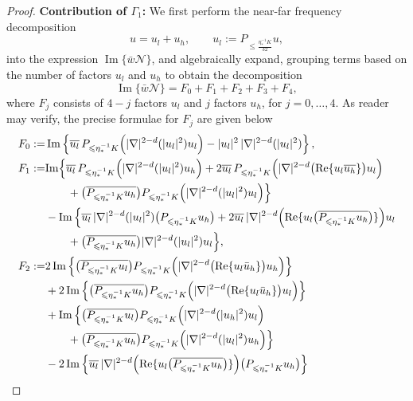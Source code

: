 \documentclass[reqno,11pt]{amsart}
\theoremstyle{plain}
\theoremstyle{definition}
\numberwithin{equation}{section}
\numberwithin{theorem}{section}
\def\leq{\leqslant}
\begin{document}
\begin{proof}
\textbf{Contribution of $\Gamma_1$:}
We first perform the near-far frequency decomposition
\[
u=u_{l}+u_{h}, \qquad u_{l} := P_{\leq\frac{\eta_{\ast}^{-1}K}{32}}u,
\]
into the expression $\operatorname{Im}\{\bar{w}\mathcal{N}\}$, and algebraically expand, grouping terms based on the number of factors $u_{l}$ and $u_{h}$ to obtain the decomposition
\[
\operatorname{Im}\{\bar{w}\mathcal{N}\} = F_0 + F_1 + F_2 + F_3 + F_4, 
\]
where $F_j$ consists of $4 - j$ factors $u_{l}$ and $j$ factors $u_{h}$, for $j = 0, \ldots, 4$. As reader may verify, the precise formulae for $F_j$ are given below
\begin{align*}
F_0 :=& \operatorname{Im}\left\{ \overline{u_l} \, P_{\leq \eta_{\ast}^{-1}K}\Bigl(|\nabla|^{2-d}(|u_l|^2) u_l\Bigr) - |u_l|^2 \, |\nabla|^{2-d}(|u_l|^2) \right\}, \\
F_1 :=& {\rm Im}\Big\{ \overline{u_l} \, P_{\leq \eta_{\ast}^{-1}K}\Bigl(|\nabla|^{2-d}(|u_l|^2) u_h\Bigr) 
+ 2\overline{u_l} \, P_{\leq \eta_{\ast}^{-1}K}\Bigl(|\nabla|^{2-d}\bigl(\operatorname{Re}\{u_l \overline{u_h}\}\bigr) u_l\Bigr)\\ 
&\qquad+ \bigl(\overline{P_{\leq \eta_{\ast}^{-1}K} u_h}\bigr) P_{\leq \eta_{\ast}^{-1}K}\Bigl(|\nabla|^{2-d}(|u_l|^2) u_l\Bigr) \Big\} \\
& - \operatorname{Im}\Big\{ \overline{u_l} \, |\nabla|^{2-d}(|u_l|^2) \bigl(P_{\leq \eta_{\ast}^{-1}K} u_h\bigr) 
+ 2\overline{u_l} \, |\nabla|^{2-d}\Bigl(\operatorname{Re}\{u_l \bigl(\overline{P_{\leq \eta_{\ast}^{-1}K} u_h}\bigr)\}\Bigr) u_l\\ 
&\qquad+ \bigl(\overline{P_{\leq \eta_{\ast}^{-1}K} u_h}\bigr) |\nabla|^{2-d}(|u_l|^2) u_l \Big\}, \\
F_2 :=& 2\operatorname{Im}\left\{ \bigl(\overline{P_{\leq \eta_{\ast}^{-1}K} u_l}\bigr) P_{\leq \eta_{\ast}^{-1}K}\Bigl(|\nabla|^{2-d}\bigl(\operatorname{Re}\{u_l \bar{u}_h\}\bigr) u_h\Bigr) \right\} \\
&+ 2\operatorname{Im}\left\{ \bigl(\overline{P_{\leq \eta_{\ast}^{-1}K} u_h}\bigr) P_{\leq \eta_{\ast}^{-1}K}\Bigl(|\nabla|^{2-d}\bigl(\operatorname{Re}\{u_l \bar{u}_h\}\bigr) u_l\Bigr) \right\} \\
& + \operatorname{Im}\Big\{ \bigl(\overline{P_{\leq \eta_{\ast}^{-1}K} u_l}\bigr) P_{\leq \eta_{\ast}^{-1}K}\Bigl(|\nabla|^{2-d}(|u_h|^2) u_l\Bigr) \\
&\qquad+ \bigl(\overline{P_{\leq \eta_{\ast}^{-1}K} u_h}\bigr) P_{\leq \eta_{\ast}^{-1}K}\Bigl(|\nabla|^{2-d}(|u_l|^2) u_h\Bigr) \Big\} \\
& - 2\operatorname{Im}\left\{ \overline{u_l} \, |\nabla|^{2-d}\Bigl(\operatorname{Re}\{u_l \bigl(\overline{P_{\leq \eta_{\ast}^{-1}K} u_h}\bigr)\}\Bigr) \bigl(P_{\leq \eta_{\ast}^{-1}K} u_h\bigr) \right\} \\

\end{align*}
\end{proof}
\end{document}
